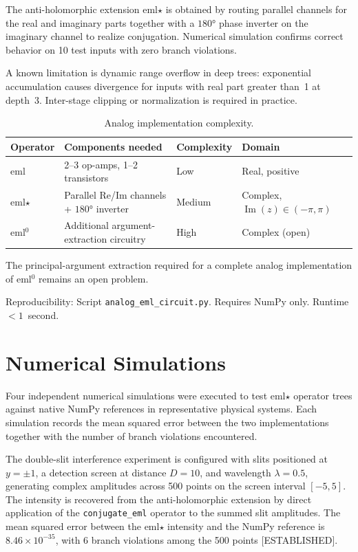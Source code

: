 \documentclass[11pt,a4paper]{article}
\begin{document}
The anti-holomorphic extension eml$\star$ is obtained by routing parallel channels for the real and imaginary parts together with a $180°$ phase inverter on the imaginary channel to realize conjugation. Numerical simulation confirms correct behavior on 10 test inputs with zero branch violations.

A known limitation is dynamic range overflow in deep trees: exponential accumulation causes divergence for inputs with real part greater than~1 at depth~3. Inter-stage clipping or normalization is required in practice.

\begin{table}[h]
\centering
\begin{tabular}{llll}
\toprule
Operator & Components needed & Complexity & Domain \\
\midrule
eml & 2--3 op-amps, 1--2 transistors & Low & Real, positive \\
eml$\star$ & Parallel Re/Im channels + $180°$ inverter & Medium & Complex, $\operatorname{Im}(z) \in (-\pi, \pi)$ \\
eml$^0$ & Additional argument-extraction circuitry & High & Complex (open) \\
\bottomrule
\end{tabular}
\caption{Analog implementation complexity.}
\end{table}

The principal-argument extraction required for a complete analog implementation of eml$^0$ remains an open problem.

Reproducibility: Script \texttt{analog\_eml\_circuit.py}. Requires NumPy only. Runtime $< 1$~second.

\section{Numerical Simulations}

Four independent numerical simulations were executed to test eml$\star$ operator trees against native NumPy references in representative physical systems. Each simulation records the mean squared error between the two implementations together with the number of branch violations encountered.

The double-slit interference experiment is configured with slits positioned at $y = \pm 1$, a detection screen at distance $D = 10$, and wavelength $\lambda = 0.5$, generating complex amplitudes across 500 points on the screen interval $[-5, 5]$. The intensity is recovered from the anti-holomorphic extension by direct application of the \texttt{conjugate\_eml} operator to the summed slit amplitudes. The mean squared error between the eml$\star$ intensity and the NumPy reference is $8.46 \times 10^{-35}$, with 6 branch violations among the 500 points [ESTABLISHED].
\end{document}
